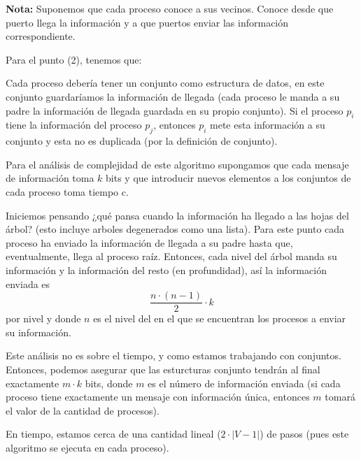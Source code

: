\textbf{Nota:} Suponemos que cada proceso conoce a sus vecinos.
Conoce desde que puerto llega la información y a que puertos
enviar las información correspondiente.
\newline

\hspace*{0.3cm} Para el punto (2), tenemos que:

Cada proceso debería tener un conjunto como estructura
de datos, en este conjunto guardaríamos la información
de llegada (cada proceso le manda a su padre la información
de llegada guardada en su propio conjunto). Si el proceso
$p_i$ tiene la información del proceso $p_j$, entonces $p_i$
mete esta información a su conjunto y esta no es duplicada
(por la definición de conjunto).
\newline

Para el análisis de complejidad de este algoritmo supongamos
que cada mensaje de información toma $k$ bits y que introducir
nuevos elementos a los conjuntos de cada proceso toma tiempo c.

Iniciemos pensando ¿qué pansa cuando la información ha llegado
a las hojas del árbol? (esto incluye arboles degenerados como una
lista). Para este punto cada proceso ha enviado la información de
llegada a su padre hasta que, eventualmente, llega al proceso raíz.
Entonces, cada nivel del árbol manda su información y la información
del resto (en profundidad), así la información enviada es
\[\frac{n \cdot (n - 1)}{2} \cdot k\]
por nivel y donde $n$ es el nivel del en el que se encuentran los
procesos a enviar su información.

Este análisis no es sobre el tiempo, y como estamos trabajando con
conjuntos. Entonces, podemos asegurar que las esturcturas conjunto
tendrán al final exactamente $m \cdot k$ bits, donde $m$ es el número
de información enviada (si cada proceso tiene exactamente un mensaje
con información única, entonces $m$ tomará el valor de la cantidad
de procesos).

En tiempo, estamos cerca de una cantidad lineal ($2 \cdot |V - 1|$) de pasos
(pues este algoritmo se ejecuta en cada proceso).

